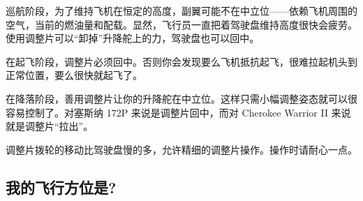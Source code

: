 巡航阶段，为了维持飞机在恒定的高度，副翼可能不在中立位——依赖飞机周围的空气，当前的燃油量和配载。显然，飞行员一直把着驾驶盘维持高度很快会疲劳。使用调整片可以“卸掉”升降舵上的力，驾驶盘也可以回中。

在起飞阶段，调整片必须回中。否则你会发现要么飞机抵抗起飞，很难拉起机头到正常位置，要么很快就起飞了。

在降落阶段，善用调整片让你的升降舵在中立位。这样只需小幅调整姿态就可以很容易控制了。对塞斯纳 172P 来说是调整片回中，而对 Cherokee Warrior II 来说就是调整片“拉出”。

调整片拨轮的移动比驾驶盘慢的多，允许精细的调整片操作。操作时请耐心一点。

\subsection{我的飞行方位是?}
\label{sec:Kierunek}

